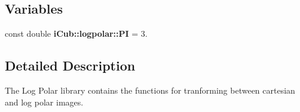 \subsection*{Variables}
\begin{DoxyCompactItemize}
\item 
const double {\bfseries i\+Cub\+::logpolar\+::\+P\+I} = 3.\label{namespaceiCub_1_1logpolar_a020c8ca4d2e250812e57b126683c6a80}

\end{DoxyCompactItemize}


\subsection{Detailed Description}
The Log Polar library contains the functions for tranforming between cartesian and log polar images. 

